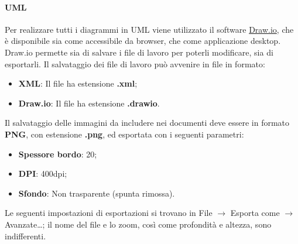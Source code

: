 \paragraph*{UML}
Per realizzare tutti i diagrammi in UML viene utilizzato il software \href{https://draw.io}{Draw.io}, che è disponibile sia come  accessibile da browser, che come applicazione desktop.
Draw.io permette sia di salvare i file di lavoro per poterli modificare, sia di esportarli.
Il salvataggio dei file di lavoro può avvenire in file in formato:
\begin{itemize}
    \item \textbf{XML}: Il file ha estensione \textbf{.xml};
    \item \textbf{Draw.io}: Il file ha estensione \textbf{.drawio}.
\end{itemize}
Il salvataggio delle immagini da includere nei documenti deve essere in formato \textbf{PNG}, con estensione \textbf{.png}, ed esportata con i seguenti parametri:
\begin{itemize}
    \item \textbf{Spessore bordo}: 20;
    \item \textbf{DPI}: 400dpi;
    \item \textbf{Sfondo}: Non trasparente (spunta rimossa).
\end{itemize}
Le seguenti impostazioni di esportazioni si trovano in File $\rightarrow$ Esporta come $\rightarrow$ Avanzate\dots; il nome del file e lo zoom, così come profondità e altezza, sono indifferenti.
